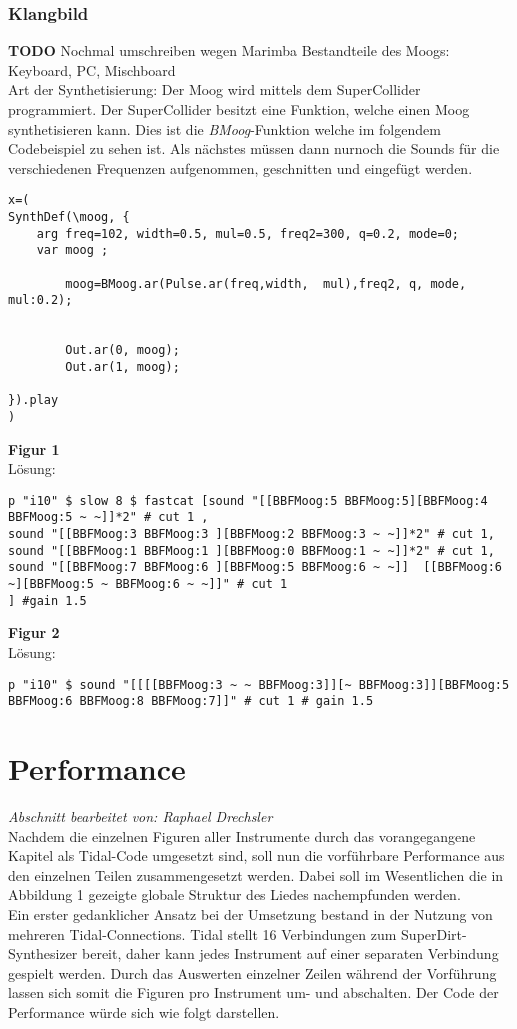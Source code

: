 \documentclass[
10pt, %
a4paper, %
oneside, %
headinclude,footinclude, %
BCOR5mm, %
]{scrartcl}
\begin{document}
\subsubsection{Klangbild}
{\color{red}\textbf{TODO}} Nochmal umschreiben wegen Marimba
Bestandteile des Moogs: Keyboard, PC, Mischboard\\
Art der Synthetisierung: Der Moog wird mittels dem SuperCollider programmiert. Der SuperCollider besitzt eine Funktion, welche einen Moog synthetisieren kann.
Dies ist die \textit{BMoog}-Funktion welche im folgendem Codebeispiel zu sehen ist. Als nächstes müssen dann nurnoch die Sounds für die verschiedenen
Frequenzen aufgenommen, geschnitten und eingefügt werden.\\
\begin{lstlisting}
x=(
SynthDef(\moog, {
	arg freq=102, width=0.5, mul=0.5, freq2=300, q=0.2, mode=0;
	var moog ;
	
		moog=BMoog.ar(Pulse.ar(freq,width,  mul),freq2, q, mode, mul:0.2);
		
		
		Out.ar(0, moog);
		Out.ar(1, moog);
	
}).play
)
\end{lstlisting}
\noindent\textbf{Figur 1}\\
Lösung:\\
\begin{lstlisting}
p "i10" $ slow 8 $ fastcat [sound "[[BBFMoog:5 BBFMoog:5][BBFMoog:4 BBFMoog:5 ~ ~]]*2" # cut 1 ,
sound "[[BBFMoog:3 BBFMoog:3 ][BBFMoog:2 BBFMoog:3 ~ ~]]*2" # cut 1,
sound "[[BBFMoog:1 BBFMoog:1 ][BBFMoog:0 BBFMoog:1 ~ ~]]*2" # cut 1,
sound "[[BBFMoog:7 BBFMoog:6 ][BBFMoog:5 BBFMoog:6 ~ ~]]  [[BBFMoog:6 ~][BBFMoog:5 ~ BBFMoog:6 ~ ~]]" # cut 1
] #gain 1.5
\end{lstlisting}
\noindent\textbf{Figur 2}\\
Lösung:\\
\begin{lstlisting}
p "i10" $ sound "[[[[BBFMoog:3 ~ ~ BBFMoog:3]][~ BBFMoog:3]][BBFMoog:5 BBFMoog:6 BBFMoog:8 BBFMoog:7]]" # cut 1 # gain 1.5
\end{lstlisting}

\section{Performance}
\textit{Abschnitt bearbeitet von: Raphael Drechsler}\\

\noindent Nachdem die einzelnen Figuren aller Instrumente durch das vorangegangene Kapitel als Tidal-Code umgesetzt sind, soll nun die vorführbare Performance aus den einzelnen Teilen zusammengesetzt werden. Dabei soll im Wesentlichen die in Abbildung 1 gezeigte globale Struktur des Liedes nachempfunden werden.\\
Ein erster gedanklicher Ansatz bei der Umsetzung bestand in der Nutzung von mehreren Tidal-Connections. Tidal stellt 16 Verbindungen zum SuperDirt-Synthesizer bereit\cite{tid14}, daher kann jedes Instrument auf einer separaten Verbindung gespielt werden. Durch das Auswerten einzelner Zeilen während der Vorführung lassen sich somit die Figuren pro Instrument um- und abschalten. Der Code der Performance würde sich wie folgt darstellen.
\end{document}
